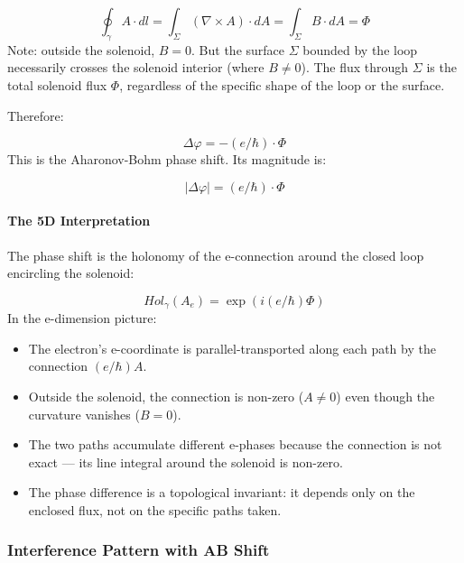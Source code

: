 \documentclass[aps,prd,preprint,superscriptaddress,longbibliography,floatfix]{revtex4-2}
\theoremstyle{remark}
\begin{document}
\begin{equation}
    \oint_\gamma A \cdot dl = \int_\Sigma (\nabla \times A) \cdot dA = \int_\Sigma B \cdot dA = \Phi
\end{equation}
Note: outside the solenoid, $B = 0$. But the surface $\Sigma$ bounded by the loop necessarily crosses the solenoid interior (where $B \neq 0$). The flux through $\Sigma$ is the total solenoid flux $\Phi$, regardless of the specific shape of the loop or the surface.

Therefore:


\begin{equation}
    \Delta\varphi = -(e/\hbar) \cdot \Phi
\end{equation}
This is the Aharonov-Bohm phase shift. Its magnitude is:


\begin{equation}
    |\Delta\varphi| = (e/\hbar) \cdot \Phi
\end{equation}

\paragraph{The 5D Interpretation}

The phase shift is the holonomy of the e-connection around the closed loop encircling the solenoid:


\begin{equation}
    Hol_\gamma(A_e) = \exp(i(e/\hbar)\Phi)
\end{equation}
In the e-dimension picture:

\begin{itemize}
  \item The electron's e-coordinate is parallel-transported along each path by the connection $(e/\hbar)A$.
  \item Outside the solenoid, the connection is non-zero ($A \neq 0$) even though the curvature vanishes ($B = 0$).
  \item The two paths accumulate different e-phases because the connection is not exact --- its line integral around the solenoid is non-zero.
  \item The phase difference is a topological invariant: it depends only on the enclosed flux, not on the specific paths taken.
\end{itemize}


\subsubsection{Interference Pattern with AB Shift}
\end{document}
